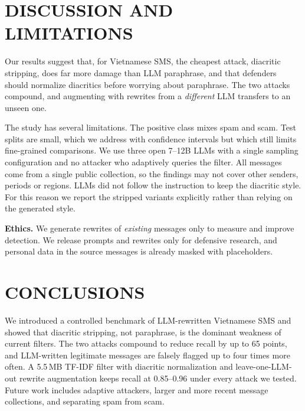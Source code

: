 \documentclass[11pt,a4paper]{article}
\begin{document}
\section{DISCUSSION AND LIMITATIONS}\label{sec:disc}
Our results suggest that, for Vietnamese SMS, the cheapest attack, diacritic stripping, does far more damage than LLM paraphrase, and that defenders should normalize diacritics before worrying about paraphrase. The two attacks compound, and augmenting with rewrites from a \emph{different} LLM transfers to an unseen one.

The study has several limitations. The positive class mixes spam and scam. Test splits are small, which we address with confidence intervals but which still limits fine-grained comparisons. We use three open 7--12B LLMs with a single sampling configuration and no attacker who adaptively queries the filter. All messages come from a single public collection, so the findings may not cover other senders, periods or regions.
LLMs did not follow the instruction to keep the diacritic style. For this reason we report the stripped variants explicitly rather than relying on the generated style.

\textbf{Ethics.} We generate rewrites of \emph{existing} messages only to measure and improve detection. We release prompts and rewrites only for defensive research, and personal data in the source messages is already masked with placeholders.

\section{CONCLUSIONS}\label{sec:concl}
We introduced a controlled benchmark of LLM-rewritten Vietnamese SMS and showed that diacritic stripping, not paraphrase, is the dominant weakness of current filters. The two attacks compound to reduce recall by up to 65 points, and LLM-written legitimate messages are falsely flagged up to four times more often. A 5.5\,MB TF-IDF filter with diacritic normalization and leave-one-LLM-out rewrite augmentation keeps recall at 0.85--0.96 under every attack we tested. Future work includes adaptive attackers, larger and more recent message collections, and separating spam from scam.

\renewcommand{\refname}{\normalfont\fontsize{12}{14}\bfseries\filcenter REFERENCES}


\end{document}
